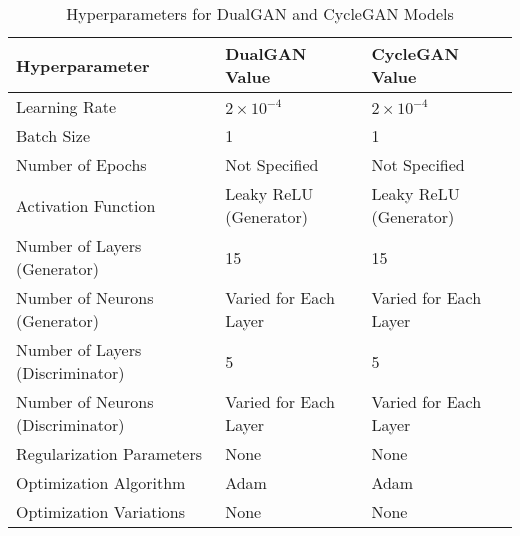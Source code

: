 \documentclass[conference]{IEEEtran}
\begin{document}
\begin{table}[htbp]
    \caption{Hyperparameters for DualGAN and CycleGAN Models}
    \begin{center}
        \begin{tabular}{|l|p{1.5cm}|p{1.5cm}|}
            \hline
            \textbf{Hyperparameter} & \textbf{DualGAN Value} & \textbf{CycleGAN Value} \\
            \hline
            Learning Rate & $2 \times 10^{-4}$ & $2 \times 10^{-4}$ \\
            \hline
            Batch Size & 1 & 1 \\
            \hline
            Number of Epochs & Not Specified & Not Specified \\
            \hline
            Activation Function & Leaky ReLU (Generator) & Leaky ReLU (Generator) \\
            \hline
            Number of Layers (Generator) & 15 & 15 \\
            \hline
            Number of Neurons (Generator) & Varied for Each Layer & Varied for Each Layer \\
            \hline
            Number of Layers (Discriminator) & 5 & 5 \\
            \hline
            Number of Neurons (Discriminator) & Varied for Each Layer & Varied for Each Layer \\
            \hline
            Regularization Parameters & None & None \\
            \hline
            Optimization Algorithm & Adam & Adam \\
            \hline
            Optimization Variations & None & None \\
            \hline
        \end{tabular}
    \end{center}
\end{table}
\end{document}
